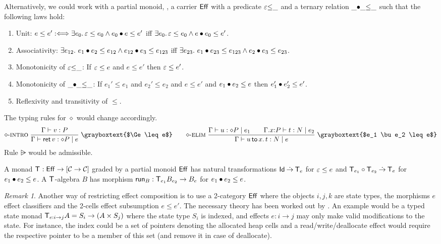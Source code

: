 \documentclass[acmsmall,review,anonymous]{acmart}\settopmatter{printfolios=true,printccs=false,printacmref=false}
\newcommand{\graybox}[1]{\grayboxtext{$#1$}}
\theoremstyle{remark}
\newtheorem{remark}{Remark}
\begin{document}
Alternatively, we could work with a partial monoid, \ie, a carrier $\Eff$ with a predicate $\Ge{\leq}\_$ and a ternary relation $\_{\bu}\_{\leq}\_$ such that
the following laws hold:
\begin{enumerate}
\item Unit: $e \leq e' \defiff \exists e_0.\, \Ge \leq e_0 \land e_0 \bu e \leq e'$ iff $\exists e_0.\, \Ge \leq e_0 \land e \bu e_0 \leq e'$.
\item Associativity: $\exists e_{12}.\ e_1 \bu e_2 \leq e_{12} \land e_{12} \bu e_3 \leq e_{123}$ iff $\exists e_{23}.\ e_1 \bu e_{23} \leq e_{123} \land e_2 \bu e_3 \leq e_{23}$.
\item Monotonicity of $\Ge{\leq}\_$: If $\Ge \leq e$ and $e \leq e'$ then $\Ge \leq e'$.
\item Monotonicity of $\_{\bu}\_{\leq}\_$:  If $e_1' \leq e_1$ and $e_2' \leq e_2$ and $e \leq e'$ and $e_1 \bu e_2 \leq e$ then $e_1' \bu e_2' \leq e'$.
\item Reflexivity and transitivity of $\leq$.
\end{enumerate}
The typing rules for $\diamond$ would change accordingly.
\begin{gather*}
 \nrux{\rintro\diamond}
     {\ValTy \Gamma v P
    }{\CompTy \Gamma {\ret v} e {\diamond P}
    }{\graybox{\Ge \leq e}}
\qquad
 \nrux{\relim\diamond}
     {\CompTy \Gamma u {e_1} {\diamond P} \qquad
      \CompTy {\ext \Gamma x P} t {e_2} N
    }{\CompTy \Gamma {\bind x u t} e N
    }{\graybox{e_1 \bu e_2 \leq e}}
\end{gather*}
Rule $\rsub$ would be admissible.

A monad $\T : \Eff \to [\CC \to \CC]$ graded by a partial monoid
$\Eff$ has natural transformations $\Id \todot \T[e]$ for $\Ge \leq e$
and $\T[e_1] \circ \T[e_2] \todot \T[e]$ for $e_1 \bu e_2 \leq e$.  A
$\T$-algebra $B$ has morphism $\run[B] : \T[e_1]B_{e_2} \to B_{e}$
for $e_1 \bu e_2 \leq e$.

\begin{remark}
Another way of restricting effect composition is to use a 2-category
$\Eff$ where the objects $i,j,k$ are state types, the morphisms $e$
effect classifiers and the 2-cells effect subsumption $e \leq e'$.
The necessary theory has been worked out by
\citet{orchardWadlerEades:msfp20}.
%
An example would be a typed state monad
$\T[e: i \to j] A = S_i \to (A \times S_j)$ where the state type $S_i$
is indexed, and effects $e : i \to j$ may only make valid
modifications to the state.
%
For instance, the index could be a set of pointers denoting the
allocated heap cells and a read/write/deallocate effect would require
the respective pointer to be a member of this set (and remove it in
case of deallocate).
\end{remark}
\end{document}
